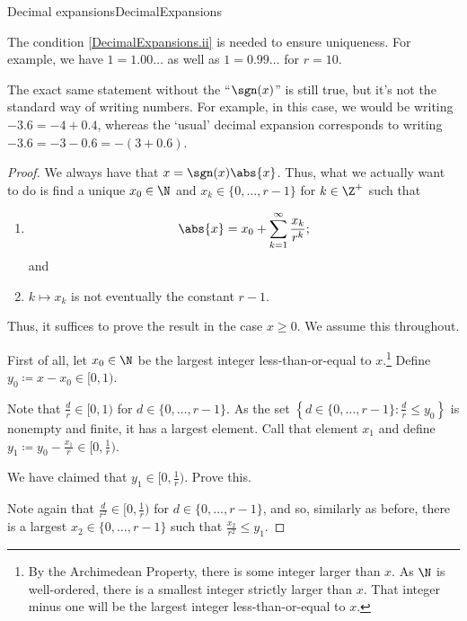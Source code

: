 \begin{thm}{Decimal expansions}{DecimalExpansions}
\begin{rmk}
\end{rmk}
\begin{rmk}
The condition \cref{DecimalExpansions.ii} is needed to ensure uniqueness.  For example, we have $1=1.00\ldots$ as well as $1=0.99\ldots$ for $r=10$.
\end{rmk}
\begin{rmk}
The exact same statement without the ``$\sgn (x)$'' is still true, but it's not the standard way of writing numbers.  For example, in this case, we would be writing $-3.6=-4+0.4$, whereas the `usual' decimal expansion corresponds to writing $-3.6=-3-0.6=-(3+0.6)$.
\end{rmk}
\begin{proof}
We always have that $x=\sgn (x)\abs{x}$.  Thus, what we actually want to do is find a unique $x_0\in \N$ and $x_k\in \{ 0,\ldots ,r-1\}$ for $k\in \Z ^+$ such that
\begin{enumerate}
\item
\begin{equation}
\abs{x}=x_0+\sum _{k=1}^{\infty}\frac{x_k}{r^k};
\end{equation}
and
\item $k\mapsto x_k$ is not eventually the constant $r-1$.
\end{enumerate}
Thus, it suffices to prove the result in the case $x\geq 0$.  We assume this throughout.

First of all, let $x_0\in \N$ be the largest integer less-than-or-equal to $x$.\footnote{By the Archimedean Property, there is some integer larger than $x$.  As $\N$ is well-ordered, there is a smallest integer strictly larger than $x$.  That integer minus one will be the largest integer less-than-or-equal to $x$.}  Define $y_0\coloneqq x-x_0\in [0,1)$.

Note that $\frac{d}{r}\in [0,1)$ for $d\in \{ 0,\ldots ,r-1\}$.  As the set $\left\{ d\in \{ 0,\ldots ,r-1\} :\frac{d}{r}\leq y_0\right\}$ is nonempty and finite, it has a largest element.  Call that element $x_1$ and define $y_1\coloneqq y_0-\frac{x_1}{r}\in [0,\frac{1}{r})$.
\begin{exr}{}{}
We have claimed that $y_1\in [0,\frac{1}{r})$.  Prove this.
\end{exr}

Note again that $\frac{d}{r^2}\in [0,\frac{1}{r})$ for $d\in \{ 0,\ldots ,r-1\}$, and so, similarly as before, there is a largest $x_2\in \{ 0,\ldots ,r-1\}$ such that $\frac{x_2}{r^2}\leq y_1$.


\end{proof}
\end{thm}
